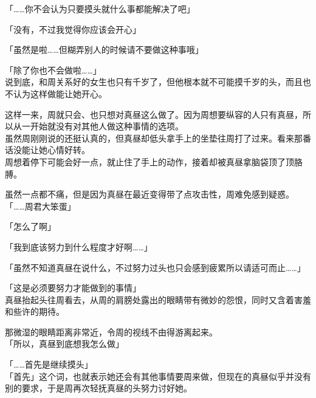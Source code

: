 「……你不会认为只要摸头就什么事都能解决了吧」

「没有，不过我觉得你应该会开心」

「虽然是啦……但糊弄别人的时候请不要做这种事哦」

「除了你也不会做啦……」\\

说到底，和周关系好的女生也只有千岁了，但他根本就不可能摸千岁的头，而且也不认为这样做能让她开心。

这样一来，周就只会、也只想对真昼这么做了。因为周想要纵容的人只有真昼，所以从一开始就没有对其他人做这种事情的选项。\\

虽然周刚刚说的还挺认真的，但真昼却低头拿手上的坐垫往周打了过来。看来那番话没能让她心情好转。\\

周想着停下可能会好一点，就止住了手上的动作，接着却被真昼拿脑袋顶了顶胳膊。

虽然一点都不痛，但是因为真昼在最近变得带了点攻击性，周难免感到疑惑。\\

「……周君大笨蛋」

「怎么了啊」

「我到底该努力到什么程度才好啊……」

「虽然不知道真昼在说什么，不过努力过头也只会感到疲累所以请适可而止……」

「这是必须要努力才能做到的事情」\\

真昼抬起头往周看去，从周的肩膀处露出的眼睛带有微妙的怨恨，同时又含着害羞和些许的期待。

那微湿的眼睛距离非常近，令周的视线不由得游离起来。\\

「所以，真昼到底想我怎么做」

「……首先是继续摸头」\\

「首先」这个词，也就表示她还会有其他事情要周来做，但现在的真昼似乎并没有别的要求，于是周再次轻抚真昼的头努力讨好她。
